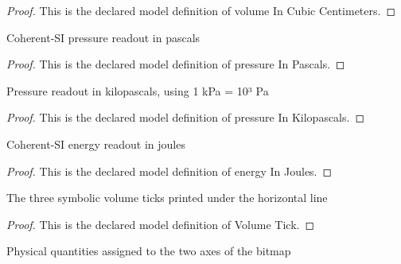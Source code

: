 \begin{proof}
  This is the declared model definition of volume In Cubic Centimeters.
\end{proof}
\begin{definition}
  \label{def:physics:phyx-mini-0404:phyxminiproblems-problemphyxmini0404-pressureinpascals}
  Coherent-SI pressure readout in pascals
\end{definition}
\begin{proof}
  This is the declared model definition of pressure In Pascals.
\end{proof}
\begin{definition}
  \label{def:physics:phyx-mini-0404:phyxminiproblems-problemphyxmini0404-pressureinkilopascals}
  Pressure readout in kilopascals, using 1 kPa = 10³ Pa
\end{definition}
\begin{proof}
  This is the declared model definition of pressure In Kilopascals.
\end{proof}
\begin{definition}
  \label{def:physics:phyx-mini-0404:phyxminiproblems-problemphyxmini0404-energyinjoules}
  Coherent-SI energy readout in joules
\end{definition}
\begin{proof}
  This is the declared model definition of energy In Joules.
\end{proof}
\begin{definition}
  \label{def:physics:phyx-mini-0404:phyxminiproblems-problemphyxmini0404-volumetick}
  The three symbolic volume ticks printed under the horizontal line
\end{definition}
\begin{proof}
  This is the declared model definition of Volume Tick.
\end{proof}
\begin{definition}
  \label{def:physics:phyx-mini-0404:phyxminiproblems-problemphyxmini0404-axisquantity}
  Physical quantities assigned to the two axes of the bitmap
\end{definition}
